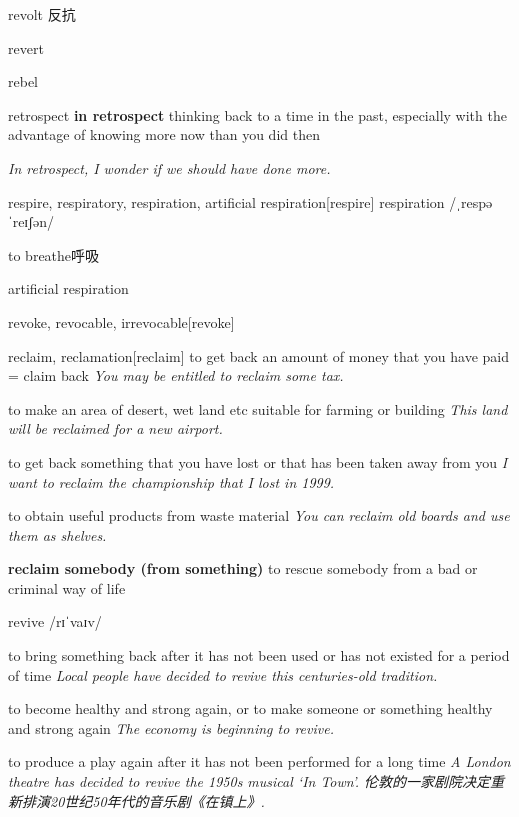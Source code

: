 \begin{DefWord}{revolt}
    反抗
\end{DefWord}

\begin{DefWord}{revert}
\end{DefWord}

\begin{DefWord}{rebel}
\end{DefWord}

\begin{DefWord}{retrospect}
    \textbf{in retrospect} thinking back to a time in the past, especially with the advantage of knowing more now than you did then

    \textit{In retrospect, I wonder if we should have done more.}
\end{DefWord}

\begin{DefWord}{respire, respiratory, respiration, artificial respiration}[respire]
    respiration /ˌrespəˈreɪʃən/ 

    to breathe呼吸

    artificial respiration
\end{DefWord}

\begin{DefWord}{revoke, revocable, irrevocable}[revoke]
\end{DefWord}

\begin{DefWord}{reclaim, reclamation}[reclaim]
    to get back an amount of money that you have paid = claim back
    \textit{You may be entitled to reclaim some tax.}

    to make an area of desert, wet land etc suitable for farming or building
    \textit{This land will be reclaimed for a new airport.}

    to get back something that you have lost or that has been taken away from you
    \textit{I want to reclaim the championship that I lost in 1999.}

    to obtain useful products from waste material
    \textit{You can reclaim old boards and use them as shelves.}

    \textbf{reclaim somebody (from something)} to rescue somebody from a bad or criminal way of life
\end{DefWord}

\begin{DefWord}{revive}
    /rɪˈvaɪv/

    to bring something back after it has not been used or has not existed for a period of time
    \textit{Local people have decided to revive this centuries-old tradition.}

    to become healthy and strong again, or to make someone or something healthy and strong again
    \textit{The economy is beginning to revive.}

    to produce a play again after it has not been performed for a long time
    \textit{A London theatre has decided to revive the 1950s musical ‘In Town'. 伦敦的一家剧院决定重新排演20世纪50年代的音乐剧《在镇上》. }
\end{DefWord}

